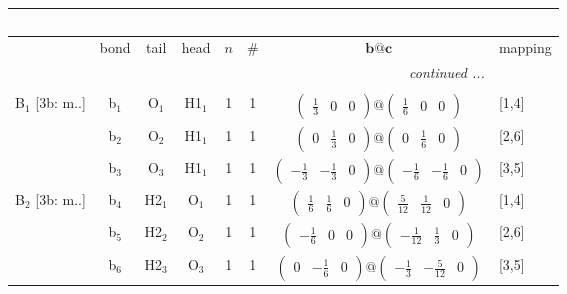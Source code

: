 \documentclass[fleqn,10pt,landscape]{article}
\begin{document}
\begin{itemize}
\begin{center}
\begin{longtable}{cc|cc|c|c|c|l}
\multicolumn{7}{l}{\tablename\ \thetable{}} \\
 \hline \hline
 & bond & tail & head & $n$ & \# & $\bm{b}@\bm{c}$ & mapping \\ \hline \endhead

 \hline \hline
\multicolumn{7}{r}{\footnotesize\it continued ...} \\ \endfoot

 \hline \hline
\multicolumn{7}{r}{} \\ \endlastfoot

B$_{1}$ [3b: m..] & b$_{1}$ & O$_{1}$ & H1$_{1}$ & 1 & 1 & $\begin{pmatrix} \frac{1}{3} & 0 & 0 \end{pmatrix}@\begin{pmatrix} \frac{1}{6} & 0 & 0 \end{pmatrix}$ & [1,4] \\
& b$_{2}$ & O$_{2}$ & H1$_{1}$ & 1 & 1 & $\begin{pmatrix} 0 & \frac{1}{3} & 0 \end{pmatrix}@\begin{pmatrix} 0 & \frac{1}{6} & 0 \end{pmatrix}$ & [2,6] \\
& b$_{3}$ & O$_{3}$ & H1$_{1}$ & 1 & 1 & $\begin{pmatrix} - \frac{1}{3} & - \frac{1}{3} & 0 \end{pmatrix}@\begin{pmatrix} - \frac{1}{6} & - \frac{1}{6} & 0 \end{pmatrix}$ & [3,5] \\ \hline
B$_{2}$ [3b: m..] & b$_{4}$ & H2$_{1}$ & O$_{1}$ & 1 & 1 & $\begin{pmatrix} \frac{1}{6} & \frac{1}{6} & 0 \end{pmatrix}@\begin{pmatrix} \frac{5}{12} & \frac{1}{12} & 0 \end{pmatrix}$ & [1,4] \\
& b$_{5}$ & H2$_{2}$ & O$_{2}$ & 1 & 1 & $\begin{pmatrix} - \frac{1}{6} & 0 & 0 \end{pmatrix}@\begin{pmatrix} - \frac{1}{12} & \frac{1}{3} & 0 \end{pmatrix}$ & [2,6] \\
& b$_{6}$ & H2$_{3}$ & O$_{3}$ & 1 & 1 & $\begin{pmatrix} 0 & - \frac{1}{6} & 0 \end{pmatrix}@\begin{pmatrix} - \frac{1}{3} & - \frac{5}{12} & 0 \end{pmatrix}$ & [3,5] \\
\end{longtable}
\end{center}


\end{itemize}
\end{document}
